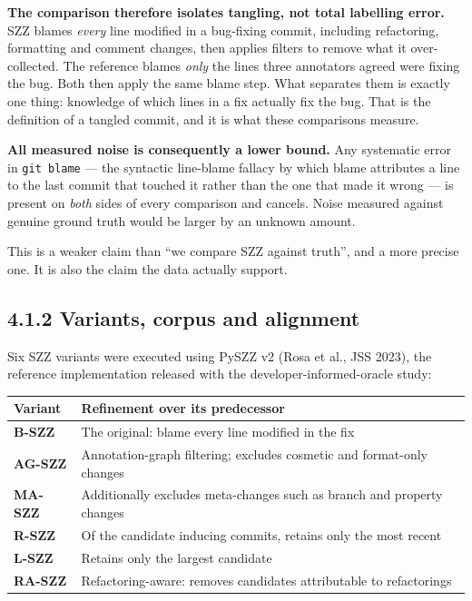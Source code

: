 \textbf{The comparison therefore isolates tangling, not total labelling
error.} SZZ blames \emph{every} line modified in a bug-fixing commit,
including refactoring, formatting and comment changes, then applies
filters to remove what it over-collected. The reference blames
\emph{only} the lines three annotators agreed were fixing the bug. Both
then apply the same blame step. What separates them is exactly one
thing: knowledge of which lines in a fix actually fix the bug. That is
the definition of a tangled commit, and it is what these comparisons
measure.

\textbf{All measured noise is consequently a lower bound.} Any
systematic error in \texttt{git\ blame} --- the syntactic line-blame
fallacy by which blame attributes a line to the last commit that touched
it rather than the one that made it wrong --- is present on \emph{both}
sides of every comparison and cancels. Noise measured against genuine
ground truth would be larger by an unknown amount.

This is a weaker claim than ``we compare SZZ against truth'', and a more
precise one. It is also the claim the data actually support.

\subsection{4.1.2 Variants, corpus and
alignment}\label{variants-corpus-and-alignment}

Six SZZ variants were executed using PySZZ v2 (Rosa et al., JSS 2023),
the reference implementation released with the developer-informed-oracle
study:

\begin{longtable}[]{@{}
  >{\raggedright\arraybackslash}p{}
  >{\raggedright\arraybackslash}p{}@{}}
\toprule\noalign{}
\begin{minipage}[b]{\linewidth}\raggedright
Variant
\end{minipage} & \begin{minipage}[b]{\linewidth}\raggedright
Refinement over its predecessor
\end{minipage} \\
\midrule\noalign{}
\endhead
\bottomrule\noalign{}
\endlastfoot
\textbf{B-SZZ} & The original: blame every line modified in the fix \\
\textbf{AG-SZZ} & Annotation-graph filtering; excludes cosmetic and
format-only changes \\
\textbf{MA-SZZ} & Additionally excludes meta-changes such as branch and
property changes \\
\textbf{R-SZZ} & Of the candidate inducing commits, retains only the
most recent \\
\textbf{L-SZZ} & Retains only the largest candidate \\
\textbf{RA-SZZ} & Refactoring-aware: removes candidates attributable to
refactorings \\
\end{longtable}

